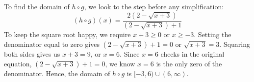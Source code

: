 {To find the domain of $h \circ g$, we look to the step before any simplification:  \[(h \circ g)(x) =  \frac{2 \left(2-\sqrt{x+3} \right)}{\left(2-\sqrt{x+3}\right)+1}\]  To keep the square root happy, we require $x+3 \geq 0$ or $x \geq -3$.  Setting the denominator equal to zero gives $\left(2-\sqrt{x+3}\right)+1=0$ or $\sqrt{x+3} = 3$.  Squaring both sides gives us $x+3=9$, or $x=6$.  Since $x=6$ checks in the original equation, $\left(2-\sqrt{x+3}\right)+1=0$, we know $x=6$ is the only zero of the denominator.  Hence, the domain of $h \circ g$ is $[-3,6) \cup (6, \infty)$.
}\\


\medskip




